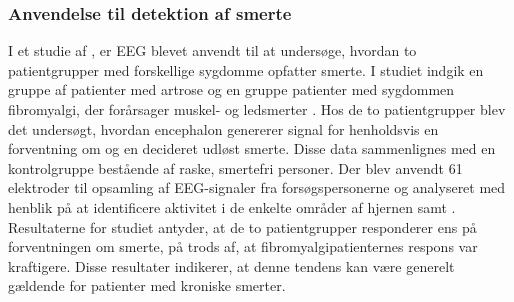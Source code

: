 \subsubsection{Anvendelse til detektion af smerte}
I et studie af \citep{Brown2013}, er EEG blevet anvendt til at undersøge, hvordan to patientgrupper med forskellige sygdomme opfatter smerte. I studiet indgik en gruppe af patienter med artrose og en gruppe patienter med sygdommen fibromyalgi, der forårsager muskel- og ledsmerter \citep{Brown2013}\citep{9}. Hos de to patientgrupper blev det undersøgt, hvordan encephalon genererer signal for henholdsvis en forventning om og en decideret udløst smerte. Disse data sammenlignes med en kontrolgruppe bestående af raske, smertefri personer. Der blev anvendt 61 elektroder til opsamling af EEG-signaler fra forsøgspersonerne og analyseret med henblik på at identificere aktivitet i de enkelte områder af hjernen samt . Resultaterne for studiet antyder, at de to patientgrupper responderer ens på forventningen om smerte, på trods af, at fibromyalgipatienternes respons var kraftigere. Disse resultater indikerer, at denne tendens kan være generelt gældende for patienter med kroniske smerter. \citep{Brown2013}
